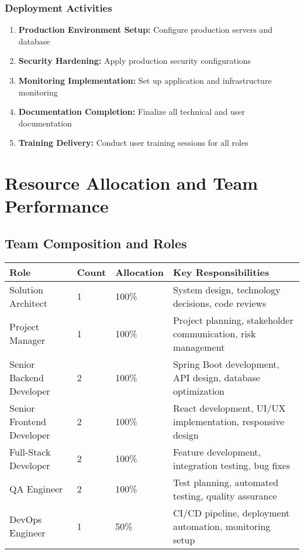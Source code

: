 \documentclass[12pt,a4paper]{article}
\begin{document}
\subsubsection{Deployment Activities}
\begin{enumerate}
    \item \textbf{Production Environment Setup:} Configure production servers and database
    \item \textbf{Security Hardening:} Apply production security configurations
    \item \textbf{Monitoring Implementation:} Set up application and infrastructure monitoring
    \item \textbf{Documentation Completion:} Finalize all technical and user documentation
    \item \textbf{Training Delivery:} Conduct user training sessions for all roles
\end{enumerate}

\section{Resource Allocation and Team Performance}

\subsection{Team Composition and Roles}

\begin{longtable}{|p{3cm}|p{2cm}|p{3cm}|p{6cm}|}
\hline
\textbf{Role} & \textbf{Count} & \textbf{Allocation} & \textbf{Key Responsibilities} \\
\hline
Solution Architect & 1 & 100\% & System design, technology decisions, code reviews \\
\hline
Project Manager & 1 & 100\% & Project planning, stakeholder communication, risk management \\
\hline
Senior Backend Developer & 2 & 100\% & Spring Boot development, API design, database optimization \\
\hline
Senior Frontend Developer & 2 & 100\% & React development, UI/UX implementation, responsive design \\
\hline
Full-Stack Developer & 2 & 100\% & Feature development, integration testing, bug fixes \\
\hline
QA Engineer & 2 & 100\% & Test planning, automated testing, quality assurance \\
\hline
DevOps Engineer & 1 & 50\% & CI/CD pipeline, deployment automation, monitoring setup \\
\hline
\end{longtable}
\end{document}
